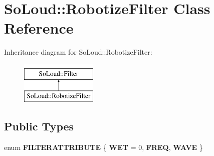 \hypertarget{class_so_loud_1_1_robotize_filter}{}\section{So\+Loud\+::Robotize\+Filter Class Reference}
\label{class_so_loud_1_1_robotize_filter}
Inheritance diagram for So\+Loud\+::Robotize\+Filter\+:\begin{figure}[H]
\begin{center}
\leavevmode
\includegraphics[height=2.000000cm]{class_so_loud_1_1_robotize_filter}
\end{center}
\end{figure}
\subsection*{Public Types}
\begin{DoxyCompactItemize}
\item 
\mbox{\label{class_so_loud_1_1_robotize_filter_abb57fef4a5784c03eb356f9bf2e6bf05}} 
enum {\bfseries F\+I\+L\+T\+E\+R\+A\+T\+T\+R\+I\+B\+U\+TE} \{ {\bfseries W\+ET} = 0, 
{\bfseries F\+R\+EQ}, 
{\bfseries W\+A\+VE}
 \}
\end{DoxyCompactItemize}
